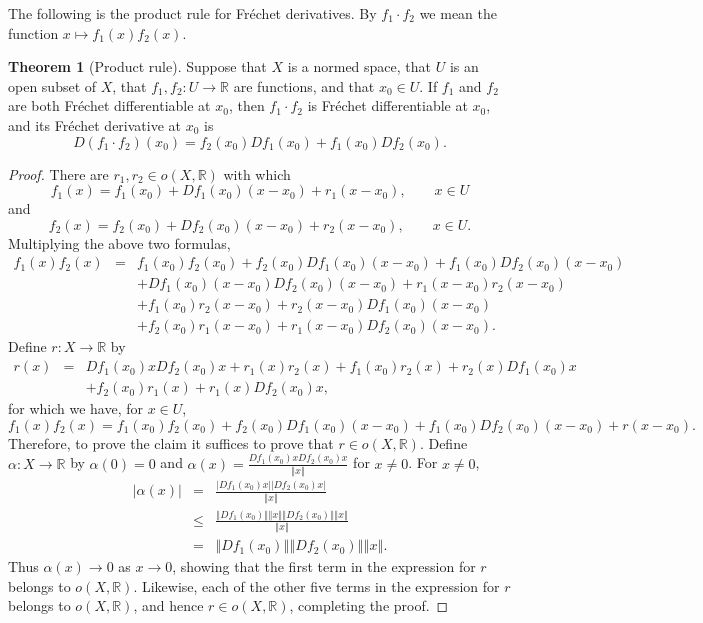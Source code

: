 \documentclass{article}
\newcommand{\norm}[1]{\left\Vert #1 \right\Vert}
\theoremstyle{definition}
\newtheorem{theorem}{Theorem}
\theoremstyle{definition}
\begin{document}
The following is the product rule for Fr\'echet derivatives. By $f_1 \cdot f_2$ we mean the function $x \mapsto f_1(x)f_2(x)$.

\begin{theorem}[Product rule]
Suppose that $X$ is a normed space, that $U$ is an open subset of $X$, that
$f_1,f_2:U \to \mathbb{R}$ are functions, and that $x_0 \in U$.
If $f_1$ and $f_2$ are both Fr\'echet differentiable at $x_0$, then $f_1\cdot f_2$ is Fr\'echet differentiable at $x_0$,
and its Fr\'echet derivative at $x_0$ is
\[
D(f_1\cdot f_2)(x_0)=f_2(x_0)Df_1(x_0)+f_1(x_0)Df_2(x_0).
\] 
\end{theorem}
\begin{proof}
There are $r_1,r_2 \in o(X,\mathbb{R})$ with which
\[
f_1(x)=f_1(x_0)+Df_1(x_0)(x-x_0)+r_1(x-x_0), \qquad x \in U
\]
and
\[
f_2(x)=f_2(x_0)+Df_2(x_0)(x-x_0)+r_2(x-x_0), \qquad x \in U.
\]
Multiplying the above two formulas, 
\begin{eqnarray*}
f_1(x)f_2(x)&=&f_1(x_0)f_2(x_0)+f_2(x_0)Df_1(x_0)(x-x_0)+f_1(x_0)Df_2(x_0)(x-x_0)\\
&&+Df_1(x_0)(x-x_0) Df_2(x_0)(x-x_0)+r_1(x-x_0)r_2(x-x_0)\\
&&+f_1(x_0)r_2(x-x_0)+r_2(x-x_0) Df_1(x_0)(x-x_0)\\
&&+f_2(x_0)r_1(x-x_0)+r_1(x-x_0)Df_2(x_0)(x-x_0).
\end{eqnarray*}
Define $r:X \to \mathbb{R}$ by
\begin{eqnarray*}
r(x)&=&Df_1(x_0)x Df_2(x_0)x + r_1(x)r_2(x)+f_1(x_0)r_2(x)+r_2(x)Df_1(x_0)x\\
&&+f_2(x_0)r_1(x)+r_1(x)Df_2(x_0)x,
\end{eqnarray*}
for which we have, for $x \in U$,
\[
f_1(x)f_2(x) = f_1(x_0)f_2(x_0)+f_2(x_0)Df_1(x_0)(x-x_0)+f_1(x_0)Df_2(x_0)(x-x_0) + r(x-x_0).
\]
Therefore, to prove the claim it suffices to prove that $r \in o(X,\mathbb{R})$.
Define $\alpha:X \to \mathbb{R}$ by $\alpha(0)=0$ and $\alpha(x)=\frac{Df_1(x_0)x Df_2(x_0)x}{\norm{x}}$ for $x \neq 0$.
For $x \neq 0$,
\begin{eqnarray*}
|\alpha(x)| &=& \frac{|Df_1(x_0)x| |Df_2(x_0)x|}{\norm{x}}\\
& \leq& \frac{\norm{Df_1(x_0)} \norm{x} \norm{Df_2(x_0)} \norm{x}}{\norm{x}}\\
&=&\norm{Df_1(x_0)} \norm{Df_2(x_0)} \norm{x}.
\end{eqnarray*}
Thus $\alpha(x) \to 0$ as $x \to 0$, showing that the first term in the expression for $r$ belongs to $o(X,\mathbb{R})$. Likewise,
each of the other five terms in the expression for $r$ belongs to $o(X,\mathbb{R})$, and hence $r \in o(X,\mathbb{R})$, completing
the proof.
\end{proof}
\end{document}
